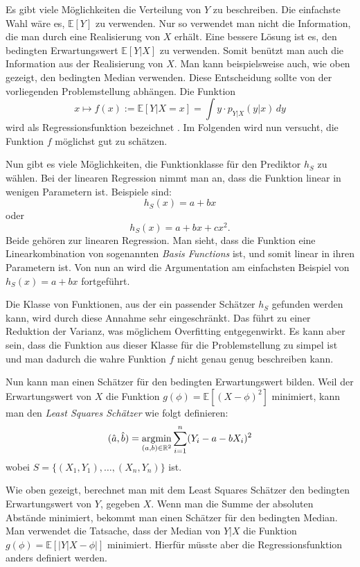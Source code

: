 Es gibt viele M\"oglichkeiten die Verteilung von $Y$ zu beschreiben. Die einfachste Wahl w\"are es, $\mathbb{E}[Y]$ zu verwenden. Nur so verwendet man nicht die
Information, die man durch eine Realisierung von $X$ erh\"alt. Eine bessere L\"osung ist es, den bedingten Erwartungswert $\mathbb{E}[Y|X]$ zu verwenden. Somit ben\"utzt man auch die Information aus der
Realisierung von $X$. Man kann beispielsweise auch, wie oben gezeigt, den bedingten Median verwenden. Diese Entscheidung sollte von der vorliegenden Problemstellung
abh\"angen. Die Funktion
$$ x \mapsto f(x) := \mathbb{E}[Y|X = x] = \int y \cdot p_{Y|X}(y|x) \,dy $$
wird als Regressionsfunktion bezeichnet \cite[Seite 209]{wasserman}. Im Folgenden wird nun versucht, die Funktion $f$ m\"oglichst gut zu sch\"atzen.

Nun gibt es viele M\"oglichkeiten, die Funktionklasse f\"ur den Prediktor $h_S$ zu w\"ahlen. Bei der linearen
Regression nimmt man an, dass die Funktion linear in wenigen Parametern ist. Beispiele sind:
$$ h_S(x) = a + bx $$
oder
$$ h_S(x) = a + bx + cx^2.$$
Beide geh\"oren zur linearen Regression. Man sieht, dass die Funktion eine Linearkombination von sogenannten \textit{Basis Functions} ist, und somit
linear in ihren Parametern ist. Von nun an wird die Argumentation am einfachsten Beispiel von $ h_S(x) = a + bx $ fortgef\"uhrt.

Die Klasse von Funktionen, aus der ein passender Sch\"atzer $h_S$ gefunden werden kann, wird durch diese Annahme sehr eingeschr\"ankt. Das f\"uhrt zu einer
Reduktion der Varianz, was m\"oglichem Overfitting entgegenwirkt. Es kann aber sein, dass die Funktion aus dieser Klasse f\"ur die Problemstellung zu simpel ist und
man dadurch die wahre Funktion $f$ nicht genau genug beschreiben kann.

Nun kann man einen Sch\"atzer f\"ur den bedingten Erwartungswert bilden.
Weil der Erwartungswert von $X$ die Funktion $g(\phi) = \mathbb{E}[(X - \phi)^2]$ minimiert, kann man den \textit{Least Squares Sch\"atzer} wie folgt definieren:
$$ (\hat{a}, \hat{b}) = \operatorname*{argmin}_{(a,b) \in \mathbb{R}^2} \sum_{i=1}^n (Y_i - a - bX_i)^2$$
wobei $S = \{(X_1, Y_1), \dots , (X_n,Y_n)\}$ ist.

Wie oben gezeigt, berechnet man mit dem Least Squares Sch\"atzer den bedingten Erwartungswert von $Y$, gegeben $X$.
Wenn man die Summe der absoluten Abst\"ande minimiert, bekommt man einen Sch\"atzer f\"ur den bedingten Median. Man verwendet die Tatsache, dass
der Median von $Y|X$ die Funktion $g(\phi) = \mathbb{E}[|Y|X - \phi|]$ minimiert. Hierfür müsste aber die Regressionsfunktion anders definiert werden.

